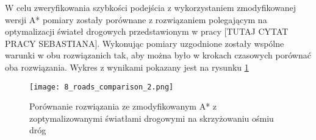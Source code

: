 W celu zweryfikowania szybkości podejścia z wykorzystaniem zmodyfikowanej wersji A* pomiary zostały porównane z rozwiązaniem polegającym na optymalizacji świateł drogowych przedstawionym w pracy [TUTAJ CYTAT PRACY SEBASTIANA].
\newline
\newline
Wykonując pomiary uzgodnione zostały wspólne warunki w obu rozwiązanich tak, aby można było w krokach czasowych porównać oba rozwiązania.
\newline
\newline
Wykres z wynikami pokazany jest na rysunku \ref{comparison}
\begin{figure}[ht]
  \texttt{[image: 8\_roads\_comparison\_2.png]}
  \caption{Porównanie rozwiązania ze zmodyfikowanym A* z zoptymalizowanymi światłami drogowymi na skrzyżowaniu ośmiu dróg}
  \label{comparison}
\end{figure}

